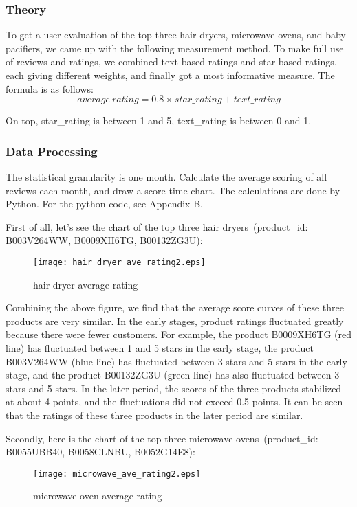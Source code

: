 \documentclass{mcmthesis}
\begin{document}
	\subsubsection{Theory}
	To get a user evaluation of the top three hair dryers, microwave ovens, and baby pacifiers, we came up with the following measurement method. To make full use of reviews and ratings, we combined text-based ratings and star-based ratings, each giving different weights, and finally got a most informative measure. The formula is as follows:
	$$
	average\ rating = 0.8 \times star\_rating + text\_rating
	$$
	
	On top, star\_rating is between 1 and 5, text\_rating is between 0 and 1.
	\subsubsection{Data Processing}
	
	The statistical granularity is one month. Calculate the average scoring of all reviews each month, and draw a score-time chart. The calculations are done by Python. For the python code, see Appendix B.
	
	First of all, let's see the chart of the top three hair dryers\ (product\_id: B003V264WW, B0009XH6TG, B00132ZG3U):
	
	\begin{figure}[H]
		\small
		\centering
		\texttt{[image: hair\_dryer\_ave\_rating2.eps]}
		\caption{hair dryer average rating} \label{fig:hair dryer average rating}
	\end{figure}
	
	Combining the above figure, we find that the average score curves of these three products are very similar. In the early stages, product ratings fluctuated greatly because there were fewer customers. For example, the product B0009XH6TG (red line) has fluctuated between 1 and 5 stars in the early stage, the product B003V264WW (blue line) has fluctuated between 3 stars and 5 stars in the early stage, and the product B00132ZG3U (green line) has also fluctuated between 3 stars and 5 stars. In the later period, the scores of the three products stabilized at about 4 points, and the fluctuations did not exceed 0.5 points. It can be seen that the ratings of these three products in the later period are similar.
	
	Secondly, here is the chart of the top three microwave ovens\    (product\_id: B0055UBB40, B0058CLNBU, B0052G14E8):
	
	\begin{figure}[H]
		\small
		\centering
		\texttt{[image: microwave\_ave\_rating2.eps]}
		\caption{microwave oven average rating} \label{fig:micorwave average rating}
	\end{figure}
	
\end{document}
